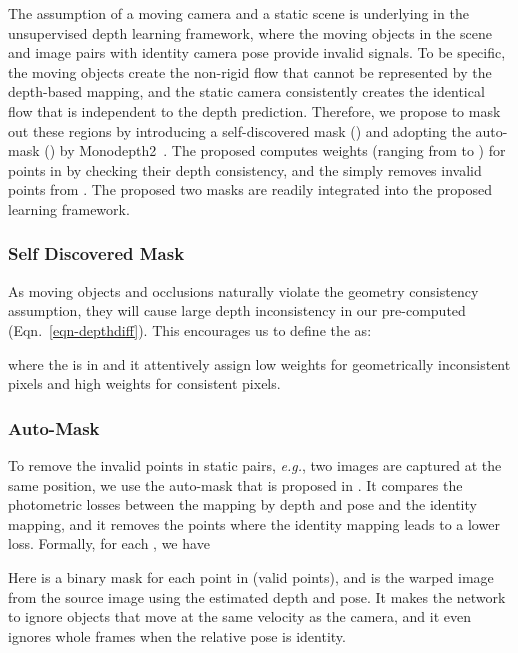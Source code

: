 \documentclass[twocolumn]{svjour3}
\renewcommand{\cite}[1]{\textcolor{blue}{\citep{#1}}}
\def\eg{\emph{e.g.}}
\newcommand{\equref}[1]{Eqn.~\ref{#1}}
\begin{document}
The assumption of a moving camera and a static scene is underlying in the unsupervised depth learning framework,
where the moving objects in the scene and image pairs with identity camera pose provide invalid signals.
To be specific, the moving objects create the non-rigid flow that cannot be represented by the depth-based mapping, and the static camera consistently creates the identical flow that is independent to the depth prediction.
Therefore, we propose to mask out these regions by introducing a self-discovered mask () and adopting 
the auto-mask () by Monodepth2~\cite{monodepth2}.
The proposed  computes weights (ranging from  to ) for points in
 by checking their depth consistency,
and the  simply removes invalid points from .
The proposed two masks are readily integrated into the proposed learning framework.

\subsubsection{Self Discovered Mask}\label{sec-mask}

As moving objects and occlusions naturally violate the geometry consistency assumption,
they will cause large depth inconsistency in our pre-computed  (\equref{eqn-depthdiff}).
This encourages us to define the  as:

where the  is in  and it attentively assign low weights for geometrically inconsistent pixels and high weights for consistent pixels.









\subsubsection{Auto-Mask}\label{sec-auto-mask}

To remove the invalid points in static pairs,
\eg, two images are captured at the same position,
we use the auto-mask  that is proposed in \cite{monodepth2}.
It compares the photometric losses between the 
mapping by depth and pose and the identity mapping,
and it removes the points where the identity mapping leads to a lower loss.
Formally, for each , we have

Here  is a binary mask for each point in  (valid points), 
and  is the warped image from the source image  
using the estimated depth and pose.
It makes the network to ignore objects that move at the same velocity as the camera, 
and it even ignores whole frames when the relative pose is identity.
\end{document}
